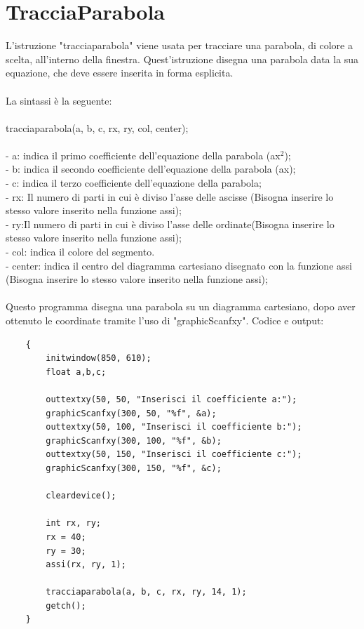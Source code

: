 \documentclass[12pt]{book}
\begin{document}
		\section{TracciaParabola}
	L'istruzione "tracciaparabola" viene usata per tracciare una parabola, di colore a scelta, all'interno della finestra.
	Quest'istruzione disegna una parabola data la sua equazione, che deve essere inserita in forma esplicita.
\\
\\La sintassi è la seguente:
\\
\\
\Large tracciaparabola(a, b, c, rx, ry, col, center);
\normalsize
\\
\\- a: indica il primo coefficiente dell'equazione della parabola (ax$^2$);
\\- b: indica il secondo coefficiente dell'equazione della parabola (ax);
\\- c: indica il terzo coefficiente dell'equazione della parabola; 
\\- rx: Il numero di parti in cui è diviso l'asse delle ascisse (Bisogna inserire lo stesso valore inserito nella funzione assi);
\\- ry:Il numero di parti in cui è diviso l'asse delle ordinate(Bisogna inserire lo stesso valore inserito nella funzione assi);
\\- col: indica il colore del segmento.
\\- center: indica il centro del diagramma cartesiano disegnato con la funzione assi (Bisogna inserire lo stesso valore inserito nella funzione assi);
\\
\\
Questo programma disegna una parabola su un diagramma cartesiano, dopo aver ottenuto le coordinate tramite l'uso di "graphicScanfxy".
\newpage
Codice e output:			
\begin{lstlisting}
	{
		initwindow(850, 610);
		float a,b,c;
		
		outtextxy(50, 50, "Inserisci il coefficiente a:");
		graphicScanfxy(300, 50, "%f", &a);
		outtextxy(50, 100, "Inserisci il coefficiente b:");
		graphicScanfxy(300, 100, "%f", &b);
		outtextxy(50, 150, "Inserisci il coefficiente c:");
		graphicScanfxy(300, 150, "%f", &c);
		
		cleardevice();
		
		int rx, ry;
		rx = 40;
		ry = 30;
		assi(rx, ry, 1);
		
		tracciaparabola(a, b, c, rx, ry, 14, 1);
		getch();
	}
\end{lstlisting}
\end{document}
